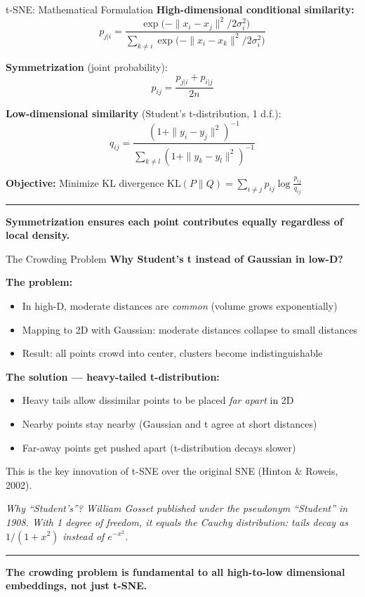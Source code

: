 \documentclass[8pt,aspectratio=169]{beamer}
\newcommand{\bottomnote}[1]{%
\vfill
\vspace{-2mm}
\textcolor{mllavender2}{\rule{\textwidth}{0.4pt}}
\vspace{1mm}
\footnotesize
\textbf{#1}
}
\begin{document}
\begin{frame}[t]{t-SNE: Mathematical Formulation}
\textbf{High-dimensional conditional similarity:}
\[
p_{j|i} = \frac{\exp\!\bigl(-\|x_i - x_j\|^2 / 2\sigma_i^2\bigr)}{\sum_{k \neq i} \exp\!\bigl(-\|x_i - x_k\|^2 / 2\sigma_i^2\bigr)}
\]

\textbf{Symmetrization} (joint probability):
\[
p_{ij} = \frac{p_{j|i} + p_{i|j}}{2n}
\]

\textbf{Low-dimensional similarity} (Student's t-distribution, 1 d.f.):
\[
q_{ij} = \frac{(1 + \|y_i - y_j\|^2)^{-1}}{\sum_{k \neq l} (1 + \|y_k - y_l\|^2)^{-1}}
\]

\textbf{Objective:} Minimize KL divergence $\text{KL}(P \| Q) = \sum_{i \neq j} p_{ij} \log \frac{p_{ij}}{q_{ij}}$
\bottomnote{Symmetrization ensures each point contributes equally regardless of local density.}
\end{frame}

\begin{frame}[t]{The Crowding Problem}
\textbf{Why Student's t instead of Gaussian in low-D?}

\vspace{0.3em}
\textbf{The problem:}
\begin{itemize}
  \item In high-D, moderate distances are \textit{common} (volume grows exponentially)
  \item Mapping to 2D with Gaussian: moderate distances collapse to small distances
  \item Result: all points crowd into center, clusters become indistinguishable
\end{itemize}

\vspace{0.3em}
\textbf{The solution --- heavy-tailed t-distribution:}
\begin{itemize}
  \item Heavy tails allow dissimilar points to be placed \textit{far apart} in 2D
  \item Nearby points stay nearby (Gaussian and t agree at short distances)
  \item Far-away points get pushed apart (t-distribution decays slower)
\end{itemize}

\vspace{0.3em}
This is the key innovation of t-SNE over the original SNE (Hinton \& Roweis, 2002).

\vspace{0.2em}
{\small \textit{Why ``Student's''? William Gosset published under the pseudonym ``Student'' in 1908. With 1 degree of freedom, it equals the Cauchy distribution: tails decay as $1/(1+x^2)$ instead of $e^{-x^2}$.}}
\bottomnote{The crowding problem is fundamental to all high-to-low dimensional embeddings, not just t-SNE.}
\end{frame}
\end{document}
